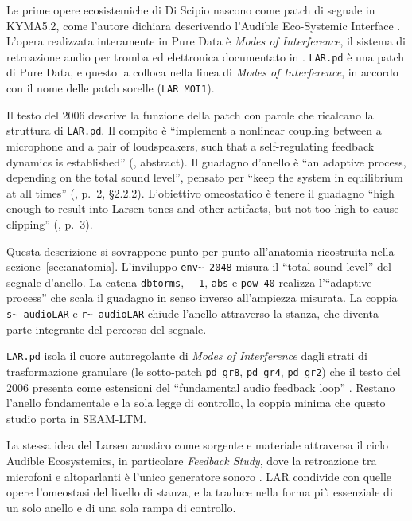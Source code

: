 \documentclass[11pt,a4paper]{article}
\begin{document}
Le prime opere ecosistemiche di Di Scipio nascono come patch di segnale in KYMA5.2, come l'autore dichiara descrivendo l'Audible Eco-Systemic Interface \cite{discipio2003ecosystemics}.
L'opera realizzata interamente in Pure Data è \emph{Modes of Interference}, il sistema di retroazione audio per tromba ed elettronica documentato in \cite{discipio2006pd}.
\texttt{LAR.pd} è una patch di Pure Data, e questo la colloca nella linea di \emph{Modes of Interference}, in accordo con il nome delle patch sorelle (\texttt{LAR MOI1}).

Il testo del 2006 descrive la funzione della patch con parole che ricalcano la struttura di \texttt{LAR.pd}.
Il compito è ``implement a nonlinear coupling between a microphone and a pair of loudspeakers, such that a self-regulating feedback dynamics is established'' (\cite{discipio2006pd}, abstract).
Il guadagno d'anello è ``an adaptive process, depending on the total sound level'', pensato per ``keep the system in equilibrium at all times'' (\cite{discipio2006pd}, p.~2, \S2.2.2).
L'obiettivo omeostatico è tenere il guadagno ``high enough to result into Larsen tones and other artifacts, but not too high to cause clipping'' (\cite{discipio2006pd}, p.~3).

Questa descrizione si sovrappone punto per punto all'anatomia ricostruita nella sezione~\ref{sec:anatomia}.
L'inviluppo \texttt{env\textasciitilde{} 2048} misura il ``total sound level'' del segnale d'anello.
La catena \texttt{dbtorms}, \texttt{- 1}, \texttt{abs} e \texttt{pow 40} realizza l'``adaptive process'' che scala il guadagno in senso inverso all'ampiezza misurata.
La coppia \texttt{s\textasciitilde{} audioLAR} e \texttt{r\textasciitilde{} audioLAR} chiude l'anello attraverso la stanza, che diventa parte integrante del percorso del segnale.

\texttt{LAR.pd} isola il cuore autoregolante di \emph{Modes of Interference} dagli strati di trasformazione granulare (le sotto-patch \texttt{pd gr8}, \texttt{pd gr4}, \texttt{pd gr2}) che il testo del 2006 presenta come estensioni del ``fundamental audio feedback loop'' \cite{discipio2006pd}.
Restano l'anello fondamentale e la sola legge di controllo, la coppia minima che questo studio porta in SEAM-LTM.

La stessa idea del Larsen acustico come sorgente e materiale attraversa il ciclo Audible Ecosystemics, in particolare \emph{Feedback Study}, dove la retroazione tra microfoni e altoparlanti è l'unico generatore sonoro \cite{discipio2003feedbackstudy}.
LAR condivide con quelle opere l'omeostasi del livello di stanza, e la traduce nella forma più essenziale di un solo anello e di una sola rampa di controllo.
\end{document}

